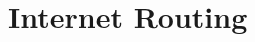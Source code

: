 \chapter{Internet Routing}
\label{cha:routing}


\iffalse TODO
\section{Overview}

Blah blah blah
\fi



